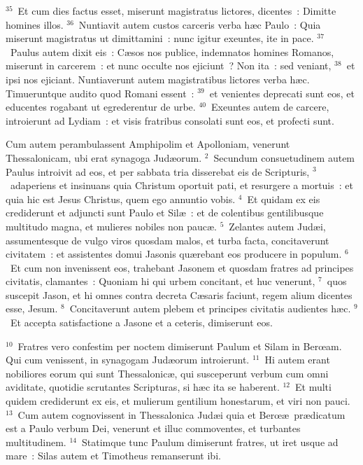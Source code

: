 ${}^{35}$~Et cum dies factus esset, miserunt magistratus lictores, dicentes~: Dimitte homines illos.
${}^{36}$~Nuntiavit autem custos carceris verba h\ae c Paulo~: Quia miserunt magistratus ut dimittamini~: nunc igitur exeuntes, ite in pace.
${}^{37}$~Paulus autem dixit eis~: C\ae sos nos publice, indemnatos homines Romanos, miserunt in carcerem~: et nunc occulte nos ejiciunt~? Non ita~: sed veniant,
${}^{38}$~et ipsi nos ejiciant. Nuntiaverunt autem magistratibus lictores verba h\ae c. Timueruntque audito quod Romani essent~:
${}^{39}$~et venientes deprecati sunt eos, et educentes rogabant ut egrederentur de urbe.
${}^{40}$~Exeuntes autem de carcere, introierunt ad Lydiam~: et visis fratribus consolati sunt eos, et profecti sunt.

\lettrine[lines=3,image=true,loversize=0.05,lraise=-0.03]{C}{}um autem perambulassent Amphipolim et Apolloniam, venerunt Thessalonicam, ubi erat synagoga Jud\ae orum.
${}^{2}$~Secundum consuetudinem autem Paulus introivit ad eos, et per sabbata tria disserebat eis de Scripturis,
${}^{3}$~adaperiens et insinuans quia Christum oportuit pati, et resurgere a mortuis~: et quia hic est Jesus Christus, quem ego annuntio vobis.
${}^{4}$~Et quidam ex eis crediderunt et adjuncti sunt Paulo et Sil\ae~: et de colentibus gentilibusque multitudo magna, et mulieres nobiles non pauc\ae .
${}^{5}$~Zelantes autem Jud\ae i, assumentesque de vulgo viros quosdam malos, et turba facta, concitaverunt civitatem~: et assistentes domui Jasonis qu\ae rebant eos producere in populum.
${}^{6}$~Et cum non invenissent eos, trahebant Jasonem et quosdam fratres ad principes civitatis, clamantes~: Quoniam hi qui urbem concitant, et huc venerunt,
${}^{7}$~quos suscepit Jason, et hi omnes contra decreta C\ae saris faciunt, regem alium dicentes esse, Jesum.
${}^{8}$~Concitaverunt autem plebem et principes civitatis audientes h\ae c.
${}^{9}$~Et accepta satisfactione a Jasone et a ceteris, dimiserunt eos.


${}^{10}$~Fratres vero confestim per noctem dimiserunt Paulum et Silam in Berœam. Qui cum venissent, in synagogam Jud\ae orum introierunt.
${}^{11}$~Hi autem erant nobiliores eorum qui sunt Thessalonic\ae , qui susceperunt verbum cum omni aviditate, quotidie scrutantes Scripturas, si h\ae c ita se haberent.
${}^{12}$~Et multi quidem crediderunt ex eis, et mulierum gentilium honestarum, et viri non pauci.
${}^{13}$~Cum autem cognovissent in Thessalonica Jud\ae i quia et Berœ\ae\ pr\ae dicatum est a Paulo verbum Dei, venerunt et illuc commoventes, et turbantes multitudinem.
${}^{14}$~Statimque tunc Paulum dimiserunt fratres, ut iret usque ad mare~: Silas autem et Timotheus remanserunt ibi.


